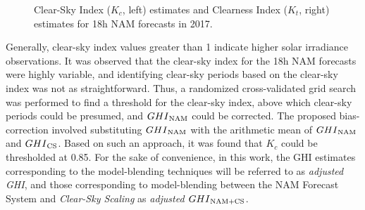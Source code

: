 \begin{figure}
\begin{center}
    \hspace{5mm}
    \caption[Clear-Sky Index and Clearness Index estimates for 18h NAM forecasts in 2017]{Clear-Sky Index ($K_c$, left) estimates and Clearness Index ($K_t$, right) estimates for 18h NAM forecasts in 2017.}
    \label{fig:fig_kc_kt_18h}
\end{center}
\end{figure}

\par Generally, clear-sky index values greater than 1 indicate higher solar irradiance observations. It was observed that the clear-sky index for the 18h NAM forecasts were highly variable, and identifying clear-sky periods based on the clear-sky index was not as straightforward. Thus, a randomized cross-validated grid search was performed to find a threshold for the clear-sky index, above which clear-sky periods could be presumed, and $GHI\textsubscript{NAM}$ could be corrected. The proposed bias-correction involved substituting $GHI\textsubscript{NAM}$ with the arithmetic mean of $GHI\textsubscript{NAM}$ and $GHI\textsubscript{CS}$. Based on such an approach, it was found that $K_c$ could be thresholded at 0.85. For the sake of convenience, in this work, the GHI estimates corresponding to the model-blending techniques will be referred to as \textit{adjusted GHI}, and those corresponding to model-blending between the NAM Forecast System and \textit{Clear-Sky Scaling} as \textit{adjusted} $GHI\textsubscript{NAM+CS}$.

